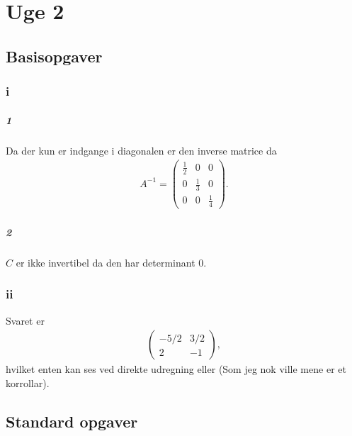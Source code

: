
\chapter{Uge 2}

	\section{Basisopgaver}

		\subsection{i}

			\paragraph{1} Da der kun er indgange i diagonalen er den inverse matrice da
				\begin{align*}
					A^{-1}=\left(\begin{array}{lll}{\frac{1}{2}} & {0} & {0} \\ {0} & {\frac{1}{3}} & {0} \\ {0} & {0} & {\frac{1}{4}}\end{array}\right).
				\end{align*} 

			\paragraph{2} $C$ er ikke invertibel da den har determinant $0$.

		\subsection{ii}

			Svaret er 
				\begin{align*}
					\left(\begin{array}{cc}{-5 / 2} & {3 / 2} \\ {2} & {-1}\end{array}\right),
				\end{align*} 
			hvilket enten kan ses ved direkte udregning eller \cite[Eksempel 3.4.3]{hesselholt2017} (Som jeg nok ville mene er et korrollar). 

	\section{Standard opgaver}

